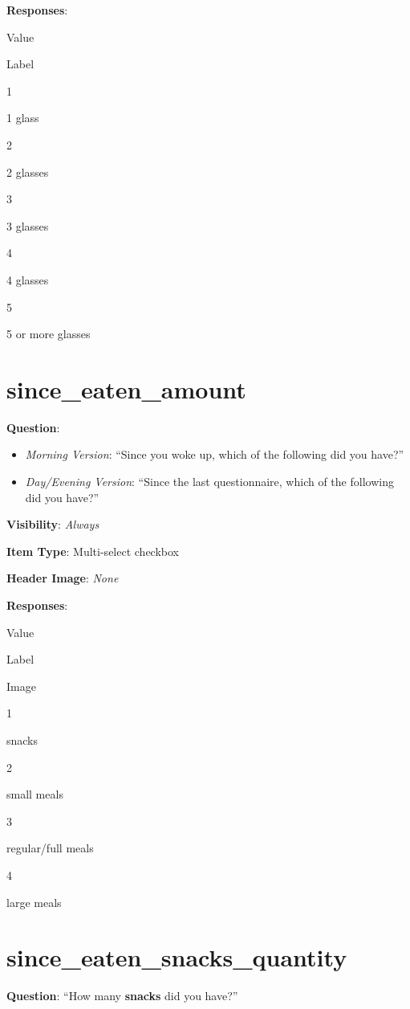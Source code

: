 \documentclass[]{book}
\providecommand{\tightlist}{%
  \setlength{\itemsep}{0pt}\setlength{\parskip}{0pt}}
\begin{document}
\textbf{Responses}:

Value

Label

1

1 glass

2

2 glasses

3

3 glasses

4

4 glasses

5

5 or more glasses

\hypertarget{since_eaten_amount}{%
\section{since\_eaten\_amount}\label{since_eaten_amount}}

\textbf{Question}:

\begin{itemize}
\tightlist
\item
  \emph{Morning Version}: ``Since you woke up, which of the following did you have?''
\item
  \emph{Day/Evening Version}: ``Since the last questionnaire, which of the following did you have?''
\end{itemize}

\textbf{Visibility}: \emph{Always}

\textbf{Item Type}: Multi-select checkbox

\textbf{Header Image}: \emph{None}

\textbf{Responses}:

Value

Label

Image

1

snacks

2

small meals

3

regular/full meals

4

large meals

\hypertarget{since_eaten_snacks_quantity}{%
\section{since\_eaten\_snacks\_quantity}\label{since_eaten_snacks_quantity}}

\textbf{Question}: ``How many \textbf{snacks} did you have?''
\end{document}
